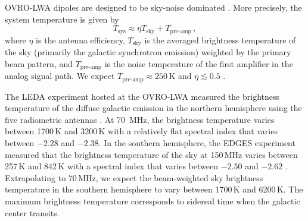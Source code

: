 \documentclass[twocolumn]{aastex62}
\begin{document}
OVRO-LWA dipoles are designed to be sky-noise dominated \citep[$\ge6$\,dB between 20--80\,MHz;
][]{2012PASP..124.1090H}. More precisely, the system temperature is given by
\begin{equation}
    T_\text{sys} \approx \eta T_\text{sky} + T_\text{pre-amp}\,,
\end{equation}
where $\eta$ is the antenna efficiency, $T_\text{sky}$ is the averaged brightness temperature of the
sky (primarily the galactic synchrotron emission) weighted by the primary beam pattern, and
$T_\text{pre-amp}$ is the noise temperature of the first amplifier in the analog signal path. We
expect $T_\text{pre-amp} \approx 250\,\text{K}$ and $\eta \lesssim 0.5$ \citep{2012PASP..124.1090H}.

The LEDA experiment hosted at the OVRO-LWA measured the brightness temperature of the diffuse
galactic emission in the northern hemisphere using the five radiometric antennas
\citep{2018MNRAS.478.4193P}. At 70~MHz, the brightness temperature varies between 1700\,K and
3200\,K with a relatively flat spectral index that varies between $-2.28$ and $-2.38$.  In the
southern hemisphere, the EDGES experiment measured that the brightness temperature of the sky at
150\,MHz varies between 257\,K and 842\,K with a spectral index that varies between $-2.50$ and
$-2.62$ \citep{2017MNRAS.464.4995M}. Extrapolating to 70\,MHz, we expect the beam-weighted sky
brightness temperature in the southern hemisphere to vary between 1700\,K and 6200\,K. The maximum
brightness temperature corresponds to sidereal time when the galactic center transits.
\end{document}
